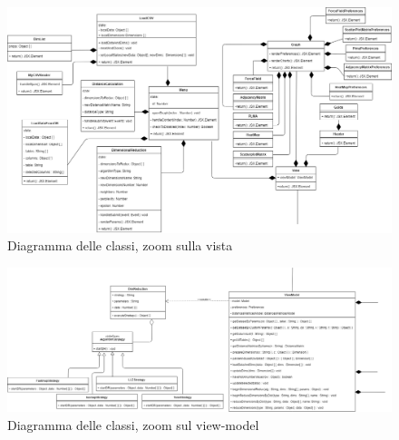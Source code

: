 \begin{landscape}
\vspace*{\fill}
\begin{figure}[hb]
\includegraphics[width=21cm]{Images/Allegato Tecnico-View}
\centering
\caption{Diagramma delle classi, zoom sulla vista}
\end{figure}
\vfill
\end{landscape}

\begin{landscape}
\vspace*{\fill}
\begin{figure}[hb]
\includegraphics[width=\linewidth ]{Images/Allegato Tecnico-ViewModel}
\centering
\caption{Diagramma delle classi, zoom sul view-model}
\end{figure}
\vfill
\end{landscape}
\newpage
